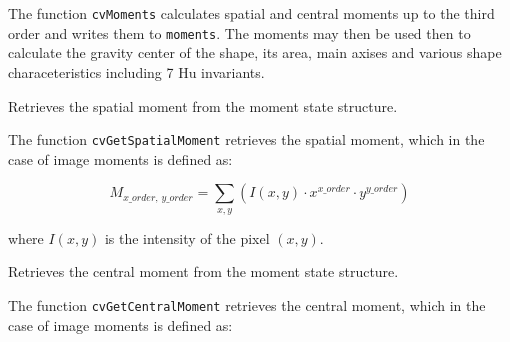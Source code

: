 The function \texttt{cvMoments} calculates spatial and central moments up to the third order and writes them to \texttt{moments}. The moments may then be used then to calculate the gravity center of the shape, its area, main axises and various shape characeteristics including 7 Hu invariants.

\label{GetSpatialMoment}

Retrieves the spatial moment from the moment state structure.


\begin{description}
\end{description}

The function \texttt{cvGetSpatialMoment} retrieves the spatial moment, which in the case of image moments is defined as:

\[
M_{x\_order, \, y\_order} = \sum_{x,y} (I(x,y) \cdot x^{x\_order} \cdot y^{y\_order})
\]

where $I(x,y)$ is the intensity of the pixel $(x, y)$.

\label{GetCentralMoment}

Retrieves the central moment from the moment state structure.


\begin{description}
\end{description}

The function \texttt{cvGetCentralMoment} retrieves the central moment, which in the case of image moments is defined as:

